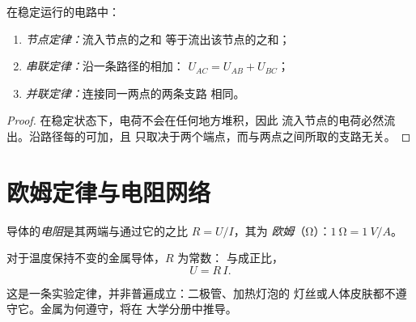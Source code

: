\begin{proposition}[电路定律]\label{prop:g11:circuits-and-power:laws}
在稳定运行的电路中：
\begin{enumerate}
  \item \emph{节点定律：}流入节点的之和
        等于流出该节点的之和；
  \item \emph{串联定律：}沿一条路径的相加：
        $U_{AC} = U_{AB} + U_{BC}$；
  \item \emph{并联定律：}连接同一两点的两条支路
        相同。
\end{enumerate}
\end{proposition}

\begin{proof}
在稳定状态下，电荷不会在任何地方堆积，因此
流入节点的电荷必然流出。沿路径每的可加，且
只取决于两个端点，而与两点之间所取的支路无关。
\end{proof}

\section{欧姆定律与电阻网络}

\begin{definition}[电阻]\label{def:g11:circuits-and-power:resistance}
导体的\emph{电阻}是其两端与通过它的之比
$R = U/I$，其为
\emph{欧姆}（\unit{\ohm}）：$\qty{1}{\ohm} = \qty{1}{V/A}$。
\end{definition}

\begin{proposition}[欧姆定律]\label{prop:g11:circuits-and-power:ohm}
对于温度保持不变的金属导体，$R$ 为常数：
与成正比，
\[ U = R\,I . \]
\end{proposition}
\admitted

\begin{remark}\label{rem:g11:circuits-and-power:ohm-limits}
这是一条实验定律，并非普遍成立：二极管、加热灯泡的
灯丝或人体皮肤都不遵守它。金属为何遵守，将在
大学分册中推导。
\end{remark}

